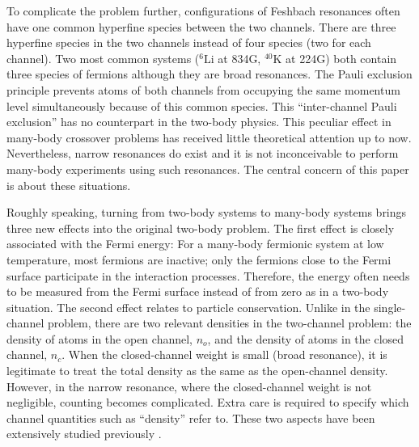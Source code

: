 \documentclass[reprint,pra]{revtex4-1}
\begin{document}

To complicate the problem  further,   configurations of Feshbach resonances often have one common hyperfine species between the two channels. There are three hyperfine species in the  two channels instead of four species (two for each channel).  Two most common systems (${}^{6}\text{Li}$ at 834G, $^{40}\text{K}$ at 224G) both contain three species of fermions although they are broad resonances.  The Pauli exclusion principle prevents  atoms of both channels from occupying the same momentum level simultaneously because of this common species.  This ``inter-channel Pauli exclusion'' has no counterpart in the two-body physics. This peculiar effect  in many-body crossover problems has  received little theoretical attention up to now.    Nevertheless,   narrow resonances do exist \cite{ChinRMP} and it is not  inconceivable to perform many-body experiments using such resonances.  The central concern of this paper is about these situations. 

Roughly speaking, turning from two-body systems to many-body systems brings three new effects into the original two-body problem.  The first effect is closely associated with the Fermi energy:  For a many-body fermionic system at low temperature, most fermions are inactive; only the fermions close to the Fermi surface participate in the interaction processes. Therefore, the energy often needs to be measured from the Fermi surface instead of from zero as in a two-body situation. 
The second effect relates to  particle conservation. Unlike in the single-channel problem, there are two relevant densities in the two-channel problem: the density of atoms in the open channel, $n_{o}$, and the density of atoms in the closed channel, $n_{c}$. When the closed-channel weight is small (broad resonance), it is legitimate to treat the total density as the same as the open-channel density.  However, in the narrow resonance, where the closed-channel weight is not negligible, counting becomes complicated.  Extra care is required to specify which channel quantities such as ``density'' refer to.  These two aspects have been   extensively studied previously \cite{JacksonNarrow,GurarieNarrow}.
\end{document}
